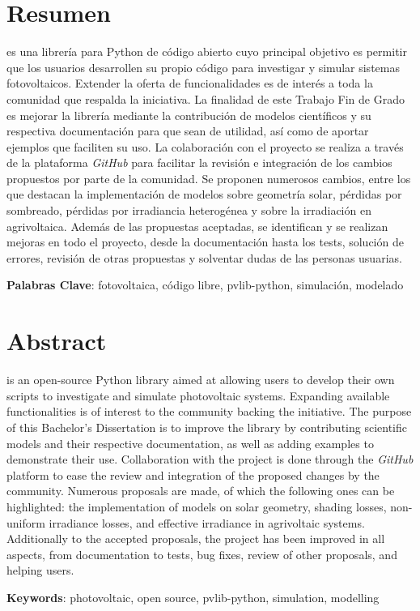 \chapter*{Resumen} \label{chp:abstract}

\pvlibpy{} es una librería para Python de código abierto cuyo principal objetivo es permitir que los usuarios desarrollen su propio código para investigar y simular sistemas fotovoltaicos. Extender la oferta de funcionalidades es de interés a toda la comunidad que respalda la iniciativa. La finalidad de este Trabajo Fin de Grado es mejorar la librería mediante la contribución de modelos científicos y su respectiva documentación para que sean de utilidad, así como de aportar ejemplos que faciliten su uso. La colaboración con el proyecto se realiza a través de la plataforma \textit{GitHub} para facilitar la revisión e integración de los cambios propuestos por parte de la comunidad. Se proponen numerosos cambios, entre los que destacan la implementación de modelos sobre geometría solar, pérdidas por sombreado, pérdidas por irradiancia heterogénea y sobre la irradiación en agrivoltaica. Además de las propuestas aceptadas, se identifican y se realizan mejoras en todo el proyecto, desde la documentación hasta los tests, solución de errores, revisión de otras propuestas y solventar dudas de las personas usuarias.

\textbf{Palabras Clave}: fotovoltaica, código libre, pvlib-python, simulación, modelado


\newpage


\chapter*{Abstract}

\pvlibpy{} is an open-source Python library aimed at allowing users to develop their own scripts to investigate and simulate photovoltaic systems. Expanding available functionalities is of interest to the community backing the initiative. The purpose of this Bachelor's Dissertation is to improve the library by contributing scientific models and their respective documentation, as well as adding examples to demonstrate their use. Collaboration with the project is done through the \textit{GitHub} platform to ease the review and integration of the proposed changes by the community. Numerous proposals are made, of which the following ones can be highlighted: the implementation of models on solar geometry, shading losses, non-uniform irradiance losses, and effective irradiance in agrivoltaic systems. Additionally to the accepted proposals, the project has been improved in all aspects, from documentation to tests, bug fixes, review of other proposals, and helping users.

\textbf{Keywords}: photovoltaic, open source, pvlib-python, simulation, modelling
